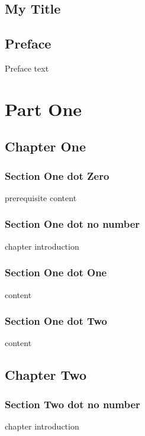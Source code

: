 \documentclass[openany]{book}
\begin{document}
\label{lxMyTOC}
\tableofcontents
\chapter*{My Title}

\chapter*{Preface}
Preface text

\part*{Part One}

\chapter{Chapter One}

\setcounter{section}{-1}
\section{Section One dot Zero}
prerequisite content

\section*{Section One dot no number}
chapter introduction

\section{Section One dot One}
content

\section{Section One dot Two}
content

\chapter{Chapter Two}

\section*{Section Two dot no number}
chapter introduction
\end{document}
